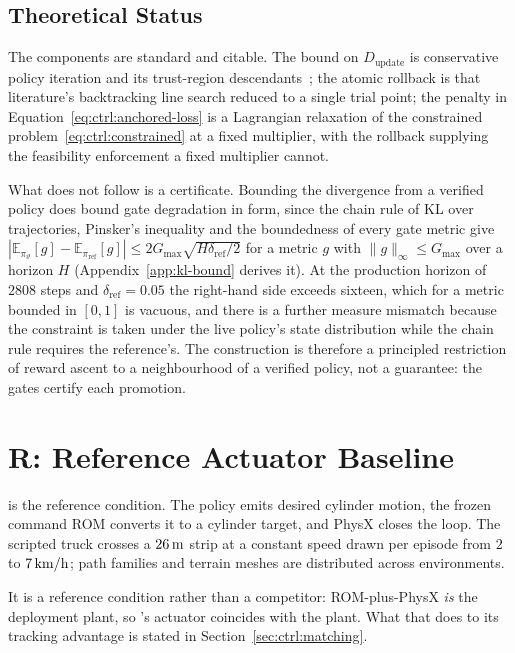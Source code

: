 \subsection{Theoretical Status}
\label{sec:ctrl:theory}

The components are standard and citable. The bound on $D_{\mathrm{update}}$ is
conservative policy iteration and its trust-region
descendants~\cite{kakade2002approximately,schulman2015trust}; the atomic
rollback is that literature's backtracking line search reduced to a single
trial point; the penalty in Equation~\eqref{eq:ctrl:anchored-loss} is a
Lagrangian relaxation of the constrained problem~\eqref{eq:ctrl:constrained} at
a fixed multiplier, with the rollback supplying the feasibility enforcement a
fixed multiplier cannot.

What does not follow is a certificate. Bounding the divergence from a verified
policy does bound gate degradation in form, since the chain rule of KL over
trajectories, Pinsker's inequality and the boundedness of every gate metric give
$|\mathbb{E}_{\pi_\vartheta}[g] - \mathbb{E}_{\pi_{\mathrm{ref}}}[g]|
\le 2 G_{\max}\sqrt{H \delta_{\mathrm{ref}}/2}$ for a metric $g$ with
$\|g\|_\infty \le G_{\max}$ over a horizon $H$
(Appendix~\ref{app:kl-bound} derives it). At the
production horizon of $2808$ steps and $\delta_{\mathrm{ref}} = 0.05$ the
right-hand side exceeds sixteen, which for a metric bounded in $[0,1]$ is
vacuous, and there is a further measure mismatch because the constraint is
taken under the live policy's state distribution while the chain rule requires
the reference's. The construction is therefore a principled restriction of
reward ascent to a neighbourhood of a verified policy, not a guarantee: the
gates certify each promotion.

\section{R: Reference Actuator Baseline}
\label{sec:ctrl:ppo-rom}

\ppoROM{} is the reference condition. The policy emits desired cylinder motion,
the frozen command ROM converts it to a cylinder target, and PhysX closes the
loop. The scripted truck crosses a $\unit[26]{m}$ strip at a constant speed
drawn per episode from $2$ to $\unit[7]{km/h}$; path families and terrain meshes
are distributed across environments.

It is a reference condition rather than a competitor: ROM-plus-PhysX \emph{is}
the deployment plant, so \ppoROM{}'s actuator coincides with the plant. What
that does to its tracking advantage is stated in
Section~\ref{sec:ctrl:matching}.

